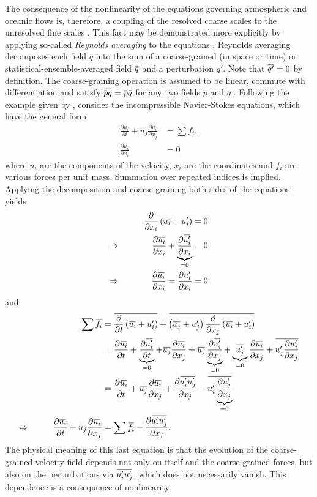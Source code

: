 \documentclass[titlepage,twoside]{article}
\numberwithin{equation}{section}
\newcommand{\pdiff}[2]{\frac{\partial #1}{\partial #2}}
\renewcommand{\bar}[1]{\mkern 1.5mu\overline{\mkern-1.5mu#1\mkern-1.5mu}\mkern 1.5mu}
\begin{document}
The consequence of the nonlinearity of the equations governing atmospheric and
oceanic flows is, therefore, a coupling of the resolved coarse scales to the
unresolved fine scales \parencite{mcfarlane2011}.
This fact may be demonstrated more explicitly by applying so-called
\emph{Reynolds averaging} to the equations \parencite{christensen2022}.
Reynolds averaging decomposes each field $q$ into the sum of a coarse-grained
(in space or time) or statistical-ensemble-averaged field $\bar{q}$ and a
perturbation $q'$. Note that $\bar{q'} = 0$ by definition. The coarse-graining
operation is assumed to be linear, commute with differentiation and satisfy
$\bar{\bar{p} q} = \bar{p} \bar{q}$ for any two fields $p$ and $q$
\parencite{monin2007}. Following the example given by
\textcite{christensen2022}, consider the incompressible Navier-Stokes
equations, which have the general form
\begin{align*}
    \pdiff{u_i}{t} + u_j \pdiff{u_i}{x_j} &= \sum f_i, \\
    \pdiff{u_i}{x_i} &= 0
\end{align*}
where $u_i$ are the components of the velocity, $x_i$ are the
coordinates and $f_i$ are various forces per unit mass. Summation over repeated
indices is implied. Applying the decomposition and coarse-graining both sides
of the equations yields
\begin{alignat*}{2}
    && \pdiff{}{x_i} \left( \bar{u_i} + u_i' \right) &= 0 \\
    \Rightarrow & \qquad &
        \pdiff{\bar{u_i}}{x_i}
        + \underbrace{\pdiff{\bar{u_i'}}{x_i}}_{=0} &= 0 \\
    \Rightarrow & \qquad &
        \pdiff{\bar{u_i}}{x_i} = \pdiff{u_i'}{x_i} &= 0
\end{alignat*}
and
\begin{alignat*}{2}
    && \sum \bar{f_i} &=
        \bar{\pdiff{}{t} \left( \bar{u_i} + u_i' \right)}
        + \bar{\left( \bar{u_j} + u_j' \right)
        \pdiff{}{x_j} \left( \bar{u_i} + u_i' \right)} \\
    &&&=
        \pdiff{\bar{u_i}}{t}
        + \underbrace{\pdiff{\bar{u_i'}}{t}}_{=0}
        + \bar{u_j} \pdiff{\bar{u_i}}{x_j}
        + \bar{u_j} \underbrace{\pdiff{\bar{u_i'}}{x_j}}_{=0}
        + \underbrace{\bar{u_j'}}_{=0} \pdiff{\bar{u_i}}{x_j}
        + \bar{u_j' \pdiff{u_i'}{x_j}} \\
    &&&=
        \pdiff{\bar{u_i}}{t} + \bar{u_j} \pdiff{\bar{u_i}}{x_j}
        + \pdiff{\bar{u_i' u_j'}}{x_j}
        - \bar{u_i' \underbrace{\pdiff{u_j'}{x_j}}_{=0}} \\
    \Leftrightarrow & \qquad &
        \pdiff{\bar{u_i}}{t} + \bar{u_j} \pdiff{\bar{u_i}}{x_j}
        &= \sum \bar{f_i} - \pdiff{\bar{u_i' u_j'}}{x_j}.
\end{alignat*}
The physical meaning of this last equation is that the evolution of the
coarse-grained velocity field depends not only on itself and the coarse-grained
forces, but also on the perturbations via $\bar{u_i' u_j'}$, which does not
necessarily vanish. This dependence is a consequence of nonlinearity.
\end{document}
